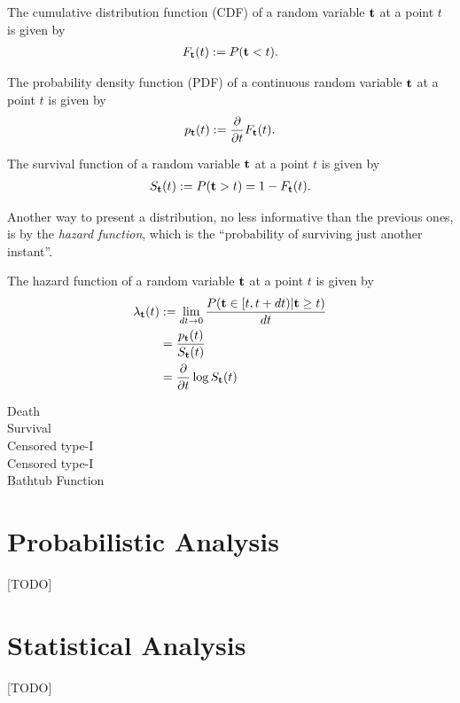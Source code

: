 \begin{definition}[CDF]
The cumulative distribution function (CDF) of a random variable $\mathbf{t}$ at a point $t$  is given by
\begin{align}
	F_{\mathbf{t}} (t):= P(\mathbf{t}<t).
\end{align}
\end{definition}


\begin{definition}[PDF]
The probability density function (PDF) of a continuous random variable $\mathbf{t}$ at a point $t$ is given by 
\begin{align}
	p_{\mathbf{t}} (t):= \frac{\partial}{\partial t}F_{\mathbf{t}} (t).
\end{align}
\end{definition}



\begin{definition}
The survival function of a random variable $\mathbf{t}$ at a point $t$ is given by 
\begin{align}
	S_{\mathbf{t}} (t):= P(\mathbf{t}>t)=1-F_{\mathbf{t}} (t).
\end{align}
\end{definition}


Another way to present a distribution, no less informative than the previous ones, is by the \emph{hazard function}, which is the ``probability of surviving just another instant''.
\begin{definition}
The hazard function of a random variable $\mathbf{t}$ at a point $t$ is given by 
\begin{align}
	\lambda_{\mathbf{t}} (t) &:= \lim_{dt\to 0}\frac{P( \mathbf{t} \in [t,t+dt)|\mathbf{t} \geq t )}{dt}\\
	&= \frac{p_{\mathbf{t}} (t)}{S_{\mathbf{t}} (t)} \\
	&= \frac{\partial}{\partial t}\log S_{\mathbf{t}} (t)
\end{align}
\end{definition}






\begin{description}
\item [Death]
\item [Survival]
\item [Censored type-I]
\item [Censored type-I]
\item [Bathtub Function]
\end{description}






\section{Probabilistic Analysis}
[TODO]




\section{Statistical Analysis}
[TODO]